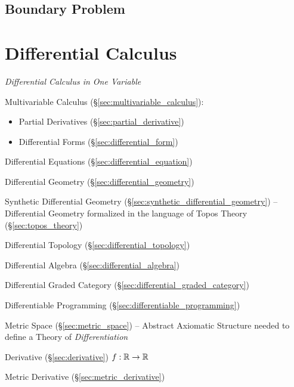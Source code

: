 \subsection{Boundary Problem}\label{sec:boundary_problem}




\section{Differential Calculus}\label{sec:differential_calculus}

\emph{Differential Calculus in One Variable}

\fist Multivariable Calculus (\S\ref{sec:multivariable_calculus}):
\begin{itemize}
  \item Partial Derivatives (\S\ref{sec:partial_derivative})
  \item Differential Forms (\S\ref{sec:differential_form})
\end{itemize}

\fist Differential Equations (\S\ref{sec:differential_equation})

\fist Differential Geometry (\S\ref{sec:differential_geometry})

\fist Synthetic Differential Geometry
(\S\ref{sec:synthetic_differential_geometry}) --
Differential Geometry formalized in the language of Topos Theory
(\S\ref{sec:topos_theory})

\fist Differential Topology (\S\ref{sec:differential_topology})

\fist Differential Algebra (\S\ref{sec:differential_algebra})

\fist Differential Graded Category (\S\ref{sec:differential_graded_category})

\fist Differentiable Programming (\S\ref{sec:differentiable_programming})

\fist Metric Space (\S\ref{sec:metric_space}) -- Abstract Axiomatic Structure
needed to define a Theory of \emph{Differentiation}

Derivative (\S\ref{sec:derivative}) $f : \mathbb{R} \rightarrow \mathbb{R}$

Metric Derivative (\S\ref{sec:metric_derivative})

